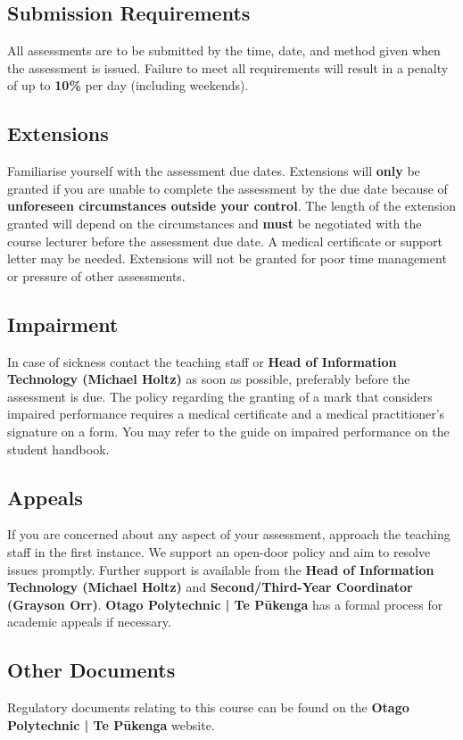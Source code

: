 \documentclass{article}
\begin{document}
\subsection*{Submission Requirements}
All assessments are to be submitted by the time, date, and method given when the assessment is issued. Failure to meet all requirements will result in a penalty of up to \textbf{10\%} per day (including weekends).

\subsection*{Extensions}
Familiarise yourself with the assessment due dates. Extensions will \textbf{only} be granted if you are unable to complete the assessment by the due date because of \textbf{unforeseen circumstances outside your control}. The length of the extension granted will depend on the circumstances and \textbf{must} be negotiated with the course lecturer before the assessment due date. A medical certificate or support letter may be needed. Extensions will not be granted for poor time management or pressure of other assessments.

\subsection*{Impairment}
In case of sickness contact the teaching staff or \textbf{Head of Information Technology (Michael Holtz)} as soon as possible, preferably before the assessment is due. The policy regarding the granting of a mark that considers impaired performance requires a medical certificate and a medical practitioner’s signature on a form. You may refer to the guide on impaired performance on the student handbook.

\subsection*{Appeals}
If you are concerned about any aspect of your assessment, approach the teaching staff in the first instance. We support an open-door policy and aim to resolve issues promptly. Further support is available from the \textbf{Head of Information Technology (Michael Holtz)} and \textbf{Second/Third-Year Coordinator (Grayson Orr)}. \textbf{Otago Polytechnic | Te Pūkenga} has a formal process for academic appeals if necessary.

\subsection*{Other Documents}
Regulatory documents relating to this course can be found on the \textbf{Otago Polytechnic | Te Pūkenga} website.
\end{document}
